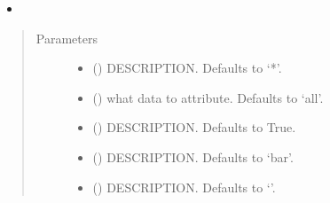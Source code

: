 \documentclass[letterpaper,10pt,english]{sphinxmanual}
\begin{document}
\begin{fulllineitems}
\begin{fulllineitems}
\begin{description}
\begin{itemize}
\item {} 
\sphinxAtStartPar
{\hyperref[\detokenize{index:modeldekom.totdif.explain_all}]{}}

\end{itemize}

\end{description}
\begin{quote}\begin{description}
\item[{Parameters}] \leavevmode\begin{itemize}
\item {} 
\sphinxAtStartPar
{} (\sphinxstyleliteralemphasis{\sphinxupquote{, }}) \textendash{} DESCRIPTION. Defaults to ‘*’.

\item {} 
\sphinxAtStartPar
{} (\sphinxstyleliteralemphasis{\sphinxupquote{|}}\sphinxstyleliteralemphasis{\sphinxupquote{|}}\sphinxstyleliteralemphasis{\sphinxupquote{|}}\sphinxstyleliteralemphasis{\sphinxupquote{, }}) \textendash{} what data to attribute. Defaults to ‘all’.

\item {} 
\sphinxAtStartPar
{} (\sphinxstyleliteralemphasis{\sphinxupquote{, }}) \textendash{} DESCRIPTION. Defaults to True.

\item {} 
\sphinxAtStartPar
{} (\sphinxstyleliteralemphasis{\sphinxupquote{, }}) \textendash{} DESCRIPTION. Defaults to ‘bar’.

\item {} 
\sphinxAtStartPar
{} (\sphinxstyleliteralemphasis{\sphinxupquote{, }}) \textendash{} DESCRIPTION. Defaults to ‘’.


\end{itemize}
\end{description}
\end{quote}
\end{fulllineitems}
\end{fulllineitems}
\end{document}
